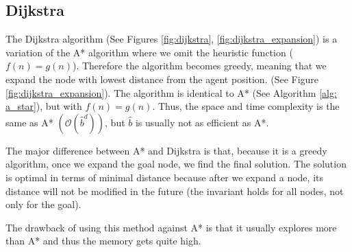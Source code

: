 \subsection{Dijkstra} \label{sec: dijkstra}
The Dijkstra algorithm \cite{choset2005principles, zhang2014multiple} (See Figures \ref{fig:dijkstra}, \ref{fig:dijkstra_expansion}) is a variation of the A* algorithm where we omit the heuristic function ($f(n) = g(n)$). Therefore the algorithm becomes greedy, meaning that we expand the node with lowest distance from the agent position. (See Figure \ref{fig:dijkstra_expansion}). The algorithm is identical to A* (See Algorithm \ref{alg: a_star}), but with $f(n) = g(n)$. Thus, the space and time complexity is the same as A* $(\mathcal{O}(\hat{b}^d))$, but $\hat{b}$ is usually not as efficient as A*.

The major difference between A* and Dijkstra is that, because it is a greedy algorithm, once we expand the goal node, we find the final solution. The solution is optimal in terms of minimal distance because after we expand a node, its distance will not be modified in the future (the invariant holds for all nodes, not only for the goal). 

The drawback of using this method against A* is that it usually explores more than A* and thus the memory gets quite high.

\pagebreak

